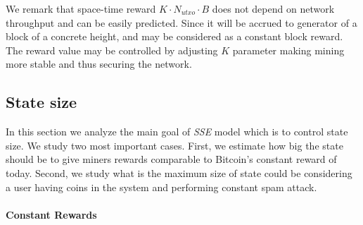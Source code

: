 \documentclass[]{llncs}   %
\newcommand{\authnote}[2]{\marginpar{\parbox{\marginparwidth}{\tiny %
  \textsf{#1 {\textcolor{blue}{notes: #2}}}}}%
  \textcolor{blue}{\textbf{\dag}}}
\newcommand{\authnote}[2]{
  \textsf{#1 \textcolor{blue}{: #2}}}
\newcommand{\authnote}[2]{}
\newcommand{\dnote}[1]{{\authnote{\textcolor{red}{Dima notes}}{#1}}}
\newcommand{\esse}{\textit{SSE}}
\newcommand{\ignore}[1]{} %
\begin{document}
\ignore{
  \begin{equation}
  \label{eq:reward}
    M_{reward} \approx M_{pg} + (K \cdot B) \cdot ((1 + r_{flow}) \cdot N_{utxo} + r_{mode} \cdot N_{lost})
  \end{equation}

  First part of this equation $M_{pg}$ is the reward of miner in existing fee models, the rest is the unique reward for \esse{} model.  In a sensible assumption $N_{utxo} >> N_{lost}$ equation \ref{eq:reward} can be simplified to

  \begin{equation}
    M_{postpaid} \approx M_{pg} + K \cdot B \cdot N_{utxo} \cdot (1 + M)
  \end{equation}

  that allows to estimate such $K$, when additional \esse{} reward will exceed common propagation reward $M_{pg}$:

  \begin{equation}
    K = {M_{pg} \over B \cdot N_{utxo} \cdot (1 + M)} \approx 10^{-9} ({BTC / (Byte \cdot Block)})
  \end{equation}

  that is naturally coincide to estimations from section \ref{eq:ltmean} while miner reward equals to user losses.
}

We remark that space-time reward $K \cdot N_{utxo} \cdot B$ does not depend on network throughput and can be easily predicted. Since it will be accrued to generator of a block of a concrete height, and may be considered as a constant block reward. The reward value may be controlled by adjusting $K$ parameter making mining more stable and thus securing the network.

\subsection{State size}

In this section we analyze the main goal of \esse{} model which is to control state size. We study two most important cases. First, we estimate how big the state should be to give miners rewards comparable to Bitcoin's constant reward of today. Second, we study what is the maximum size of state could be considering a user having coins in the system and performing constant spam attack. \dnote{last sentense is not clean}

\paragraph{Constant Rewards}
\end{document}
